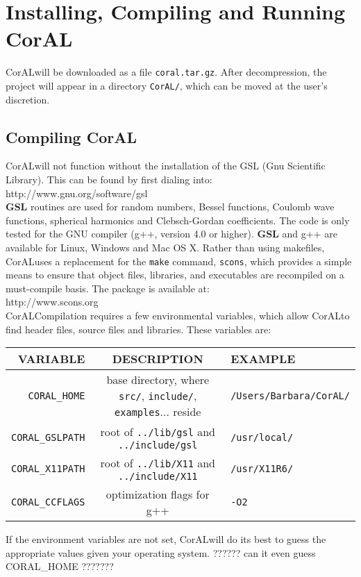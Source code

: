 \documentclass[10pt]{article}
\def\tab{\hspace*{9pt}}
\newcommand{\coral}{CorAL}
\begin{document}
\section{Installing, Compiling and Running \coral}

\coral will be downloaded as a file {\tt coral.tar.gz}. After decompression, the project will appear in a directory {\tt CorAL/}, which can be moved at the user's discretion.

\subsection{Compiling \coral}

\coral will not function without the installation of the GSL (Gnu Scientific Library). This can be found by first dialing into:\\
\tab http://www.gnu.org/software/gsl\\
{\bf GSL} routines are used for random numbers, Bessel functions, Coulomb wave functions, spherical harmonics and Clebsch-Gordan coefficients. The code is only tested for the GNU compiler (g++, version 4.0 or higher). {\bf GSL} and g++ are available for Linux, Windows and Mac OS X. Rather than using makefiles, \coral uses a replacement for the {\tt make} command, {\tt scons}, which provides a simple means to ensure that object files, libraries, and executables are recompiled on a must-compile basis. The package is available at:\\
\tab http://www.scons.org\\

\coral Compilation requires a few environmental variables, which allow \coral to find header files, source files and libraries. These variables are:\vspace*{-8pt}
\begin{center}
\begin{tabular}{|r|c|l|} \hline
VARIABLE & DESCRIPTION & EXAMPLE \\ \hline
{\tt CORAL\_HOME} & base directory, where {\tt src/}, {\tt include/}, {\tt examples}... reside & {\tt /Users/Barbara/CorAL/} \\ \hline
{\tt CORAL\_GSLPATH}& root of {\tt ../lib/gsl} and {\tt ../include/gsl} & {\tt /usr/local/} \\ \hline
{\tt CORAL\_X11PATH}& root of {\tt ../lib/X11} and {\tt ../include/X11} & {\tt /usr/X11R6/} \\ \hline
{\tt CORAL\_CCFLAGS} & optimization flags for g++ & {\tt -O2} \\ \hline
\end{tabular}
\end{center}
\vspace*{-8pt}
\noindent
If the environment variables are not set, \coral will do its best to guess the appropriate values given your operating system. ?????? can it even guess CORAL\_HOME ???????
\end{document}
